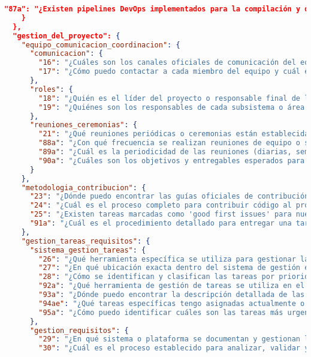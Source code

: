 \begin{lstlisting}[language=json, caption={Listado de elicitación de preguntas procesadas y clasificadas}, label={listado:preguntas}]
      "87a": "¿Existen pipelines DevOps implementados para la compilación y despliegue en los diferentes entornos?"
    }
  },
  "gestion_del_proyecto": {
    "equipo_comunicacion_coordinacion": {
      "comunicacion": {
        "16": "¿Cuáles son los canales oficiales de comunicación del equipo (chat, email, videollamadas)?",
        "17": "¿Cómo puedo contactar a cada miembro del equipo y cuál es su rol o área de responsabilidad?"
      },
      "roles": {
        "18": "¿Quién es el líder del proyecto o responsable final de las decisiones?",
        "19": "¿Quiénes son los responsables de cada subsistema o área del proyecto y cuáles son sus responsabilidades específicas?"
      },
      "reuniones_ceremonias": {
        "21": "¿Qué reuniones periódicas o ceremonias están establecidas en el proyecto y cuál es su propósito?",
        "88a": "¿Con qué frecuencia se realizan reuniones de equipo o seguimiento del proyecto?",
        "89a": "¿Cuál es la periodicidad de las reuniones (diarias, semanales, etc.) y su duración estimada?",
        "90a": "¿Cuáles son los objetivos y entregables esperados para cada tipo de reunión?"
      }
    },
    "metodologia_contribucion": {
      "23": "¿Dónde puedo encontrar las guías oficiales de contribución al proyecto?",
      "24": "¿Cuál es el proceso completo para contribuir código al proyecto, desde la asignación hasta la integración?",
      "25": "¿Existen tareas marcadas como 'good first issues' para nuevos contribuyentes? ¿Dónde puedo encontrarlas?",
      "91a": "¿Cuál es el procedimiento detallado para entregar una tarea completada (revisión, validación, merge)?"
    },
    "gestion_tareas_requisitos": {
      "sistema_gestion_tareas": {
        "26": "¿Qué herramienta específica se utiliza para gestionar las tareas del proyecto (Jira, Trello, GitHub Projects, etc.)?",
        "27": "¿En qué ubicación exacta dentro del sistema de gestión están descritas las tareas pendientes?",
        "28": "¿Cómo se identifican y clasifican las tareas por prioridad o urgencia?",
        "92a": "¿Qué herramienta de gestión de tareas se utiliza en el proyecto y cómo accedo a ella?",
        "93a": "¿Dónde puedo encontrar la descripción detallada de las tareas asignadas o disponibles?",
        "94ae": "¿Qué tareas específicas tengo asignadas actualmente o debo realizar?",
        "95a": "¿Cómo puedo identificar cuáles son las tareas más urgentes o prioritarias en este momento?"
      },
      "gestion_requisitos": {
        "29": "¿En qué sistema o plataforma se documentan y gestionan los requisitos del proyecto?",
        "30": "¿Cuál es el proceso establecido para analizar, validar y aprobar nuevos requisitos?",

\end{lstlisting}
